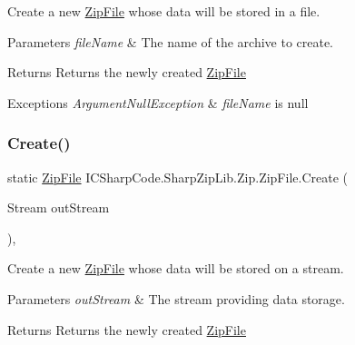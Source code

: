 Create a new \hyperlink{class_i_c_sharp_code_1_1_sharp_zip_lib_1_1_zip_1_1_zip_file}{Zip\+File} whose data will be stored in a file. 


\begin{DoxyParams}{Parameters}
{\em file\+Name} & The name of the archive to create.\\
\hline
\end{DoxyParams}
\begin{DoxyReturn}{Returns}
Returns the newly created \hyperlink{class_i_c_sharp_code_1_1_sharp_zip_lib_1_1_zip_1_1_zip_file}{Zip\+File}
\end{DoxyReturn}

\begin{DoxyExceptions}{Exceptions}
{\em Argument\+Null\+Exception} & {\itshape file\+Name}  is null\\
\hline
\end{DoxyExceptions}
\mbox{\label{class_i_c_sharp_code_1_1_sharp_zip_lib_1_1_zip_1_1_zip_file_a80e98c2c63579ebf1ccd5f4f931e8a97}} 
\subsubsection{\texorpdfstring{Create()}{Create()}\hspace{0.1cm}{\footnotesize\ttfamily [2/2]}}
{\footnotesize\ttfamily static \hyperlink{class_i_c_sharp_code_1_1_sharp_zip_lib_1_1_zip_1_1_zip_file}{Zip\+File} I\+C\+Sharp\+Code.\+Sharp\+Zip\+Lib.\+Zip.\+Zip\+File.\+Create (\begin{DoxyParamCaption}\item[{Stream}]{out\+Stream }\end{DoxyParamCaption})\hspace{0.3cm}{\ttfamily [inline]}, {\ttfamily [static]}}



Create a new \hyperlink{class_i_c_sharp_code_1_1_sharp_zip_lib_1_1_zip_1_1_zip_file}{Zip\+File} whose data will be stored on a stream. 


\begin{DoxyParams}{Parameters}
{\em out\+Stream} & The stream providing data storage.\\
\hline
\end{DoxyParams}
\begin{DoxyReturn}{Returns}
Returns the newly created \hyperlink{class_i_c_sharp_code_1_1_sharp_zip_lib_1_1_zip_1_1_zip_file}{Zip\+File}
\end{DoxyReturn}

